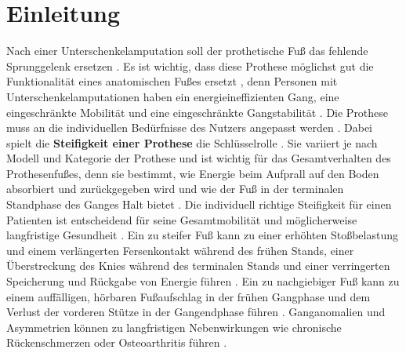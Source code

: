 \section{Einleitung}
Nach einer Unterschenkelamputation soll der prothetische Fuß das fehlende Sprunggelenk ersetzen \cite{Louessard.2022}. Es ist wichtig, dass diese Prothese möglichst gut die Funktionalität eines anatomischen Fußes ersetzt \cite{Stevens.2018}, denn Personen mit Unterschenkelamputationen haben ein energieineffizienten Gang, eine eingeschränkte Mobilität und eine eingeschränkte Gangstabilität \cite{Major.2014}\cite{Vaca.2022}.
Die Prothese muss an die individuellen Bedürfnisse des Nutzers angepasst werden \cite{Stevens.2018}. Dabei spielt die \textbf{Steifigkeit einer Prothese} die Schlüsselrolle \cite{Shepherd.2020}. 
Sie variiert je nach Modell und Kategorie der Prothese und ist wichtig für das Gesamtverhalten des Prothesenfußes, denn sie bestimmt, wie Energie beim Aufprall auf den Boden absorbiert und zurückgegeben wird und wie der Fuß in der terminalen Standphase des Ganges Halt bietet \cite{Shepherd.2020}. Die individuell richtige Steifigkeit für einen Patienten ist entscheidend für seine Gesamtmobilität und möglicherweise langfristige Gesundheit \cite{Shepherd.2020}. 
Ein zu steifer Fuß kann zu einer erhöhten Stoßbelastung und einem verlängerten Fersenkontakt während des frühen Stands, einer Überstreckung des Knies während des terminalen Stands und einer verringerten Speicherung und Rückgabe von Energie führen \cite{Shepherd.2020}. Ein zu nachgiebiger Fuß kann zu einem auffälligen, hörbaren Fußaufschlag in der frühen Gangphase und dem Verlust der vorderen Stütze in der Gangendphase führen \cite{Shepherd.2020}. 
Ganganomalien und Asymmetrien können zu langfristigen Nebenwirkungen wie chronische Rückenschmerzen oder Osteoarthritis führen \cite{Shepherd.2020}.




